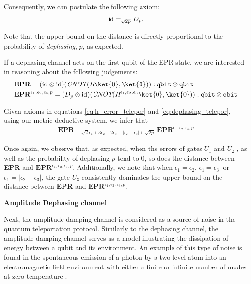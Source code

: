      Consequently, we can postulate the following axiom:
      \begin{align} \label{eq:dephasing_telepor}
         \mathrm{id} =_{\sqrt{2p}}  D_p  .
      \end{align}
      
      Note that the upper bound on the distance is directly proportional to the probability of \emph{dephasing}, $p$, as expected.

     If a dephasing channel acts on the first qubit of the EPR state, we are interested in reasoning about the following judgements:
     \begin{align*}
      &\textbf{EPR} = (\id \otimes \id)(\emph{CNOT} (\emph{H}\ket{0},\ket{0})) : \mathtt{qbit} \otimes
      \mathtt{qbit}  \\ 
      &\textbf{EPR}^{\epsilon_1,\epsilon_2, \epsilon_3,p} =  (D_p \otimes \id) (\emph{CNOT} ( \emph{H}^{\epsilon_1,\epsilon_2, \epsilon_3}\ket{0},\ket{0})) : \mathtt{qbit} \otimes
      \mathtt{qbit} 
   \end{align*}

   Given axioms in equations \eqref{eq:h_error_telepor} and \eqref{eq:dephasing_telepor}, using our metric deductive system, we infer that
   \begin{align} \label{eq:epr_error_teleport}
    \textbf{EPR} =_{\sqrt{2}\epsilon_1 + 3 \epsilon_2 + 2\epsilon_3 + |\epsilon_2-\epsilon_3| + \sqrt{2p}} \textbf{EPR}^{\epsilon_1,\epsilon_2, \epsilon_3,p}
   \end{align}

    Once again, we observe that, as expected,  when the errors of gates $U_1$ and  $U_2$ , as well as the probability of dephasing $p$ tend to $0$, so does the distance between \textbf{EPR} and $\textbf{EPR}^{\epsilon_1,\epsilon_2, \epsilon_3,p}$. Additionally, we note that when $\epsilon_1 = \epsilon_2$, $\epsilon_1 = \epsilon_3$, or $\epsilon_1 = |\epsilon_2 - \epsilon_3|$, the gate $U_3$ consistently dominates the upper bound on the distance between \textbf{EPR} and $\textbf{EPR}^{\epsilon_1,\epsilon_2,\epsilon_3,p}$.


    \vspace{5pt}

     \textbf{Amplitude Dephasing channel}

     Next, the amplitude-damping channel is considered as a source of noise in the quantum teleportation protocol. Similarly to the dephasing channel, the amplitude damping channel serves as a model illustrating the dissipation of energy between a qubit and its environment. An example of this type of noise is found in the spontaneous emission of a photon by a two-level atom into an electromagnetic field environment with either a finite or infinite number of modes at zero temperature \cite{salles2008experimental, Wang_2011}.


